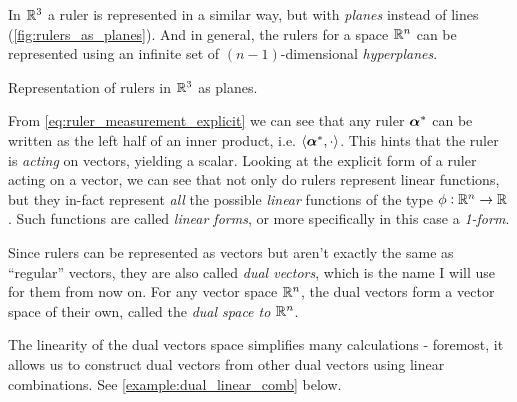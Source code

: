 In $\Rs[3]$ a ruler is represented in a similar way, but with \textit{planes} instead of lines (\cref{fig:rulers_as_planes}). And in general, the rulers for a space $\Rs[n]$ can be represented using an infinite set of $(n-1)$-dimensional \textit{hyperplanes}.

\begin{marginfigure}
    \begin{center}
    \end{center}
    \caption{Representation of rulers in $\Rs[3]$ as planes.}
    \label{fig:rulers_as_planes}
\end{marginfigure}

From \cref{eq:ruler_measurement_explicit} we can see that any ruler $\dualvec{\alpha}$ can be written as the left half of an inner product, i.e. $\inner{\dualvec{\alpha}}{\cdot}$. This hints that the ruler is \textit{acting} on vectors, yielding a scalar. Looking at the explicit form of a ruler acting on a vector, we can see that not only do rulers represent linear functions, but they in-fact represent \textit{all} the possible \textit{linear} functions of the type $\phi:\Rs[n]\to\Rs$. Such functions are called \textit{linear forms}, or more specifically in this case a \textit{1-form}.

Since rulers can be represented as vectors but aren't exactly the same as \enquote{regular} vectors, they are also called \textit{dual vectors}, which is the name I will use for them from now on. For any vector space $\Rs[n]$, the dual vectors form a vector space of their own, called the \textit{dual space to $\Rs[n]$}.

The linearity of the dual vectors space simplifies many calculations - foremost, it allows us to construct dual vectors from other dual vectors using linear combinations. See \cref{example:dual_linear_comb} below.

